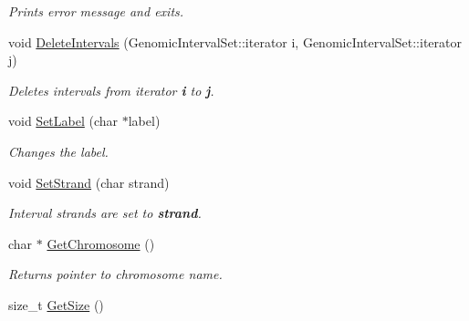\begin{CompactItemize}
\begin{CompactList}\small\item\em Prints error message and exits. \item\end{CompactList}\item 
\hypertarget{classGenomicRegion_ad8566a736786134b72e7bf74296e807}{
void \hyperlink{classGenomicRegion_ad8566a736786134b72e7bf74296e807}{DeleteIntervals} (GenomicIntervalSet::iterator i, GenomicIntervalSet::iterator j)}
\label{classGenomicRegion_ad8566a736786134b72e7bf74296e807}

\begin{CompactList}\small\item\em Deletes intervals from iterator {\bf i} to {\bf j}. \item\end{CompactList}\item 
\hypertarget{classGenomicRegion_bc547e770917e859fa434d6c54954916}{
void \hyperlink{classGenomicRegion_bc547e770917e859fa434d6c54954916}{SetLabel} (char $\ast$label)}
\label{classGenomicRegion_bc547e770917e859fa434d6c54954916}

\begin{CompactList}\small\item\em Changes the label. \item\end{CompactList}\item 
\hypertarget{classGenomicRegion_e795532404bad8b93bec632c20d12b9d}{
void \hyperlink{classGenomicRegion_e795532404bad8b93bec632c20d12b9d}{SetStrand} (char strand)}
\label{classGenomicRegion_e795532404bad8b93bec632c20d12b9d}

\begin{CompactList}\small\item\em Interval strands are set to {\bf strand}. \item\end{CompactList}\item 
\hypertarget{classGenomicRegion_815baa00d7d33f179181560a1fe468fc}{
char $\ast$ \hyperlink{classGenomicRegion_815baa00d7d33f179181560a1fe468fc}{GetChromosome} ()}
\label{classGenomicRegion_815baa00d7d33f179181560a1fe468fc}

\begin{CompactList}\small\item\em Returns pointer to chromosome name. \item\end{CompactList}\item 
\hypertarget{classGenomicRegion_5bff7a3e83b0bc9bfb5441270d0ba1ae}{
size\_\-t \hyperlink{classGenomicRegion_5bff7a3e83b0bc9bfb5441270d0ba1ae}{GetSize} ()}
\label{classGenomicRegion_5bff7a3e83b0bc9bfb5441270d0ba1ae}


\end{CompactItemize}
